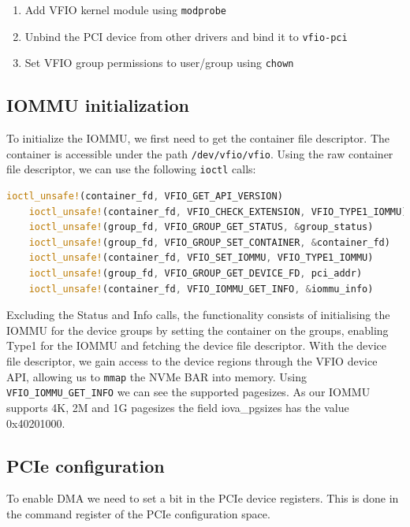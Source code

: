 \begin{enumerate}
    \item Add VFIO kernel module using \texttt{modprobe}
    \item Unbind the PCI device from other drivers and bind it to \texttt{vfio-pci}
    \item Set VFIO group permissions to user/group using \texttt{chown}
\end{enumerate}

\subsection{IOMMU initialization}\label{sec:iommuinit}
To initialize the IOMMU, we first need to get the container file descriptor. The container is accessible under the path \texttt{/dev/vfio/vfio}. Using the raw container file descriptor, we can use the following \texttt{ioctl} calls:

\begin{lstlisting}[language=Rust, caption={\texttt{ioctl} calls needed for IOMMU initialization}, label=lst:containerioctls]
    ioctl_unsafe!(container_fd, VFIO_GET_API_VERSION)
    ioctl_unsafe!(container_fd, VFIO_CHECK_EXTENSION, VFIO_TYPE1_IOMMU)
    ioctl_unsafe!(group_fd, VFIO_GROUP_GET_STATUS, &group_status)
    ioctl_unsafe!(group_fd, VFIO_GROUP_SET_CONTAINER, &container_fd)
    ioctl_unsafe!(container_fd, VFIO_SET_IOMMU, VFIO_TYPE1_IOMMU)
    ioctl_unsafe!(group_fd, VFIO_GROUP_GET_DEVICE_FD, pci_addr)
    ioctl_unsafe!(container_fd, VFIO_IOMMU_GET_INFO, &iommu_info)   
\end{lstlisting}

Excluding the Status and Info calls, the functionality consists of initialising the IOMMU for the device groups by setting the container on the groups, enabling Type1 for the IOMMU and fetching the device file descriptor. With the device file descriptor, we gain access to the device regions through the VFIO device API, allowing us to \texttt{mmap} the NVMe BAR into memory. Using \texttt{VFIO\_IOMMU\_GET\_INFO} we can see the supported pagesizes. As our IOMMU supports 4K, 2M and 1G pagesizes the field iova\_pgsizes has the value 0x40201000.

\subsection{PCIe configuration}\label{sec:pcieconfig}
To enable DMA we need to set a bit in the PCIe device registers. %
This is done in the command register of the PCIe configuration space.


